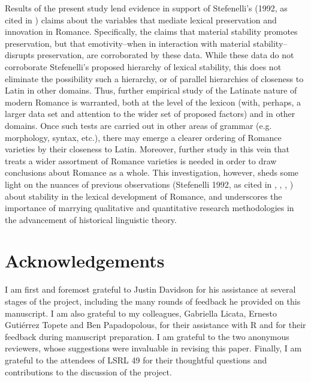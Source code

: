 \documentclass[output=paper,colorlinks,citecolor=brown,
]{langscibook}
\begin{document}
Results of the present study lend evidence in support of Stefenelli’s (1992, as cited in \citealt{stefenelli_lexical_2011}) claims about the variables that mediate lexical preservation and innovation in Romance. Specifically, the claims that material stability promotes preservation, but that emotivity–when in interaction with material stability–disrupts preservation, are corroborated by these data. While these data do not corroborate Stefenelli’s proposed hierarchy of lexical stability, this does not eliminate the possibility such a hierarchy, or of parallel hierarchies of closeness to Latin in other domains. Thus, further empirical study of the Latinate nature of modern Romance is warranted, both at the level of the lexicon (with, perhaps, a larger data set and attention to the wider set of proposed factors) and in other domains. Once such tests are carried out in other areas of grammar (e.g. morphology, syntax, etc.), there may emerge a clearer ordering of Romance varieties by their closeness to Latin. Moreover, further study in this vein that treats a wider assortment of Romance varieties is needed in order to draw conclusions about Romance as a whole. This investigation, however, sheds some light on the nuances of previous observations (Stefenelli 1992, as cited in \citealt{stefenelli_lexical_2011}, \citealt{posner_romance_1996}, \citealt{glessgen_linguistique_2007}, \citealt{alkire_romance_2010}) about stability in the lexical development of Romance, and underscores the importance of marrying qualitative and quantitative research methodologies in the advancement of historical linguistic theory.

\section*{Acknowledgements}
I am first and foremost grateful to Justin Davidson for his assistance at several stages of the project, including the many rounds of feedback he provided on this manuscript. I am also grateful to my colleagues, Gabriella Licata, Ernesto Gutiérrez Topete and Ben Papadopolous, for their assistance with R and for their feedback during manuscript preparation. I am grateful to the two anonymous reviewers, whose suggestions were invaluable in revising this paper. Finally, I am grateful to the attendees of LSRL 49 for their thoughtful questions and contributions to the discussion of the project. 

\printbibliography[heading=subbibliography,notkeyword=this]
\end{document}
